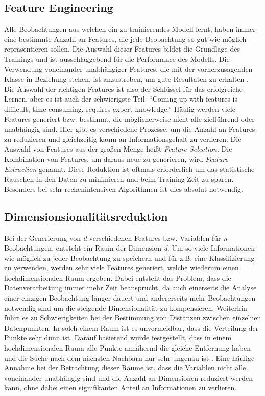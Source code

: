 \subsection{Feature Engineering}
Alle Beobachtungen aus welchen ein zu trainierendes Modell lernt, haben immer eine bestimmte Anzahl an Features, die jede Beobachtung so gut wie möglich repräsentieren sollen. Die Auswahl dieser Features bildet die Grundlage des Trainings und ist ausschlaggebend für die Performance des Modells. Die Verwendung voneinander unabhängiger Features, die mit der vorherzusagenden Klasse in Beziehung stehen, ist anzustreben, um gute Resultaten zu erhalten \cite[Kap.~8]{domingos2012few}. Die Auswahl der richtigen Features ist also der Schlüssel für das erfolgreiche Lernen, aber es ist auch der schwierigste Teil. "`Coming up with features is difficult, time-consuming, requires expert knowledge."' \cite{ng2013machine} Häufig werden viele Features generiert bzw. bestimmt, die möglicherweise nicht alle zielführend oder unabhängig sind. Hier gibt es verschiedene Prozesse, um die Anzahl an Features zu reduzieren und gleichzeitig kaum an Informationsgehalt zu verlieren. Die Auswahl von Features aus der großen Menge heißt \emph{Feature Selection}. Die Kombination von Features, um daraus neue zu generieren, wird \emph{Feature Extraction} genannt. Diese Reduktion ist oftmals erforderlich um das statistische Rauschen in den Daten zu minimieren und beim Training Zeit zu sparen. Besonders bei sehr rechenintensiven Algorithmen ist dies absolut notwendig.

\subsection{Dimensionsionalitätsreduktion}
Bei der Generierung von \textit{d} verschiedenen Features bzw. Variablen für \textit{n} Beobachtungen, entsteht ein Raum der Dimension \textit{d}. 
Um so viele Informationen wie möglich zu jeder Beobachtung zu speichern und für z.B. eine Klassifizierung zu verwenden, werden sehr viele Features generiert, welche wiederum einen hochdimensionalen Raum ergeben. Dabei entsteht das Problem, dass die Datenverarbeitung immer mehr Zeit beansprucht, da auch einerseits die Analyse einer einzigen Beobachtung länger dauert und andererseits mehr Beobachtungen notwendig sind um die steigende Dimensionalität zu kompensieren. Weiterhin führt es zu Schwierigkeiten bei der Bestimmung von Distanzen zwischen einzelnen Datenpunkten. In solch einem Raum ist es unvermeidbar, dass die Verteilung der Punkte sehr dünn ist. Darauf basierend wurde festgestellt, dass in einem hochdimensionalen Raum alle Punkte annähernd die gleiche Entfernung haben und die Suche nach dem nächsten Nachbarn nur sehr ungenau ist \cite[Kap.~1]{hinneburg2000nearest}. Eine häufige Annahme bei der Betrachtung dieser Räume ist, dass die Variablen nicht alle voneinander unabhängig sind und die Anzahl an Dimensionen reduziert werden kann, ohne dabei einen signifikanten Anteil an Informationen zu verlieren.

